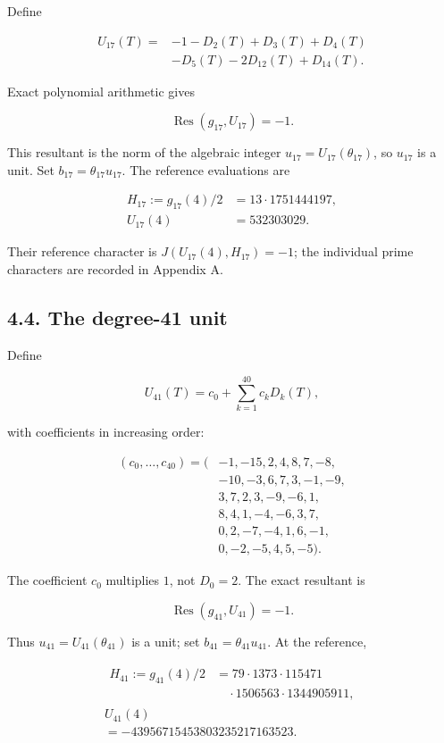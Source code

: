 \documentclass[11pt,a4paper]{article}
\begin{document}
Define

\[
\begin{aligned}
U_{17}(T)={}&-1-D_2(T)+D_3(T)+D_4(T)\\
&-D_5(T)-2D_{12}(T)+D_{14}(T).
\end{aligned}
\tag{4.4}
\]

Exact polynomial arithmetic gives

\[
\operatorname{Res}(g_{17},U_{17})=-1.
\tag{4.5}
\]

This resultant is the norm of the algebraic integer
\(u_{17}=U_{17}(\theta_{17})\), so \(u_{17}\) is a unit. Set
\(b_{17}=\theta_{17}u_{17}\). The reference evaluations are

\[
\begin{aligned}
H_{17}:=g_{17}(4)/2&=13\cdot1751444197,\\
U_{17}(4)&=532303029.
\end{aligned}
\tag{4.6}
\]

Their reference character is \(J(U_{17}(4),H_{17})=-1\); the individual
prime characters are recorded in Appendix A.

\subsection{4.4. The degree-41 unit}\label{detector41}

Define

\[
U_{41}(T)=c_0+\sum_{k=1}^{40}c_kD_k(T),
\tag{4.7}
\]

with coefficients in increasing order:

\[
\begin{aligned}
(c_0,\ldots,c_{40})=(&-1,-15,2,4,8,7,-8,\\
&-10,-3,6,7,3,-1,-9,\\
&3,7,2,3,-9,-6,1,\\
&8,4,1,-4,-6,3,7,\\
&0,2,-7,-4,1,6,-1,\\
&0,-2,-5,4,5,-5).
\end{aligned}
\tag{4.8}
\]

The coefficient \(c_0\) multiplies \(1\), not \(D_0=2\). The exact
resultant is

\[
\operatorname{Res}(g_{41},U_{41})=-1.
\tag{4.9}
\]

Thus \(u_{41}=U_{41}(\theta_{41})\) is a unit; set
\(b_{41}=\theta_{41}u_{41}\). At the reference,

\[
\begin{gathered}
\begin{aligned}
H_{41}:=g_{41}(4)/2
&=79\cdot1373\cdot115471\\
&\quad\cdot1506563\cdot1344905911,
\end{aligned}\\[0.4em]
U_{41}(4)\\
=-43956715453803235217163523.
\end{gathered}
\tag{4.10}
\]
\end{document}
